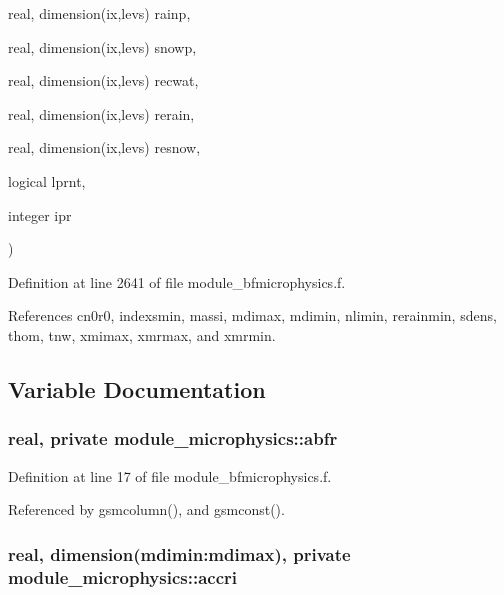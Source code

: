 {\begin{DoxyParamCaption}
\item[{real, dimension(ix,levs)}]{rainp, }
\item[{real, dimension(ix,levs)}]{snowp, }
\item[{real, dimension(ix,levs)}]{recwat, }
\item[{real, dimension(ix,levs)}]{rerain, }
\item[{real, dimension(ix,levs)}]{resnow, }
\item[{logical}]{lprnt, }
\item[{integer}]{ipr}
\end{DoxyParamCaption}
)}\hypertarget{namespacemodule__microphysics_a3e5e830e9ac0ef923bf65dda93abce33}{}\label{namespacemodule__microphysics_a3e5e830e9ac0ef923bf65dda93abce33}


Definition at line 2641 of file module\+\_\+bfmicrophysics.\+f.



References cn0r0, indexsmin, massi, mdimax, mdimin, nlimin, rerainmin, sdens, thom, tnw, xmimax, xmrmax, and xmrmin.



\subsection{Variable Documentation}
\subsubsection[{\texorpdfstring{abfr}{abfr}}]{\setlength{\rightskip}{0pt plus 5cm}real, private module\+\_\+microphysics\+::abfr\hspace{0.3cm}{\ttfamily [private]}}\hypertarget{namespacemodule__microphysics_a8f4f8d798ec89d8bb550fa6b6f8eda06}{}\label{namespacemodule__microphysics_a8f4f8d798ec89d8bb550fa6b6f8eda06}


Definition at line 17 of file module\+\_\+bfmicrophysics.\+f.



Referenced by gsmcolumn(), and gsmconst().

\subsubsection[{\texorpdfstring{accri}{accri}}]{\setlength{\rightskip}{0pt plus 5cm}real, dimension(mdimin\+:mdimax), private module\+\_\+microphysics\+::accri\hspace{0.3cm}{\ttfamily [private]}}\hypertarget{namespacemodule__microphysics_a85112c2881ca373d648a39bd0c5843fa}{}\label{namespacemodule__microphysics_a85112c2881ca373d648a39bd0c5843fa}


